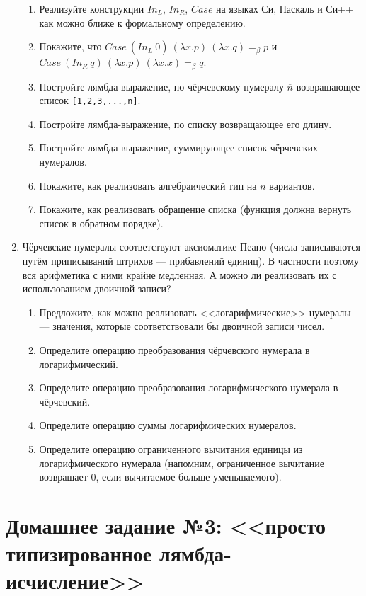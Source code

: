 \documentclass[10pt,a4paper,oneside]{article}
\begin{document}
\begin{enumerate}
\begin{enumerate}
\item Реализуйте конструкции $In_L$, $In_R$, $Case$ на языках Си, Паскаль и Си++ как можно
ближе к формальному определению.
\item Покажите, что $Case\ (In_L\ \overline{0})\ (\lambda x.p)\ (\lambda x.q) =_\beta p$ и 
                    $Case\ (In_R\ q)\ (\lambda x.p)\ (\lambda x.x) =_\beta q$.
\item Постройте лямбда-выражение, по чёрчевскому нумералу $\overline{n}$ возвращающее список \verb![1,2,3,...,n]!.
\item Постройте лямбда-выражение, по списку возвращающее его длину.
\item Постройте лямбда-выражение, суммирующее список чёрчевских нумералов.
\item Покажите, как реализовать алгебраический тип на $n$ вариантов.
\item Покажите, как реализовать обращение списка (функция должна вернуть список в обратном порядке).
\end{enumerate}

\item Чёрчевские нумералы соответствуют аксиоматике Пеано (числа записываются путём приписываний
штрихов --- прибавлений единиц). В частности поэтому вся арифметика с ними крайне медленная.
А можно ли реализовать их с использованием двоичной записи?

\begin{enumerate} 
\item Предложите, как можно реализовать <<логарифмические>> нумералы --- значения,
которые соответствовали бы двоичной записи чисел.
\item Определите операцию преобразования чёрчевского нумерала в логарифмический.
\item Определите операцию преобразования логарифмического нумерала в чёрчевский.
\item Определите операцию суммы логарифмических нумералов.
\item Определите операцию ограниченного вычитания единицы из логарифмического нумерала
(напомним, ограниченное вычитание возвращает 0, если вычитаемое больше уменьшаемого).
\end{enumerate}

\end{enumerate}

\section*{Домашнее задание №3: <<просто типизированное лямбда-исчисление>>}
\end{document}
